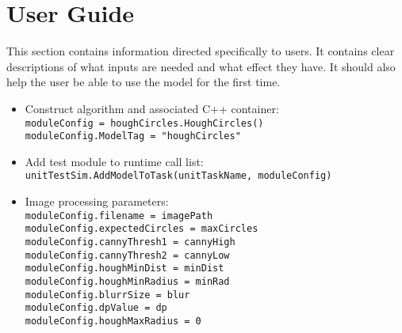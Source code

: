 
\section{User Guide}
This section contains information directed specifically to users. It contains clear descriptions of what inputs are needed and what effect they have. It should also help the user be able to use the model for the first time.

\begin{itemize}
\item Construct algorithm and associated C++ container:\\
\texttt{moduleConfig = houghCircles.HoughCircles()}\\
\texttt{moduleConfig.ModelTag = "houghCircles"}\\
\item Add test module to runtime call list: \\
\texttt{unitTestSim.AddModelToTask(unitTaskName, moduleConfig)}\\
\item Image processing parameters: \\
\texttt{moduleConfig.filename = imagePath}\\
\texttt{moduleConfig.expectedCircles = maxCircles}\\
\texttt{moduleConfig.cannyThresh1 = cannyHigh}\\
\texttt{moduleConfig.cannyThresh2 = cannyLow}\\
\texttt{moduleConfig.houghMinDist = minDist}\\
\texttt{moduleConfig.houghMinRadius = minRad}\\
\texttt{moduleConfig.blurrSize = blur}\\
\texttt{moduleConfig.dpValue = dp}\\
\texttt{moduleConfig.houghMaxRadius = 0}
\end{itemize}